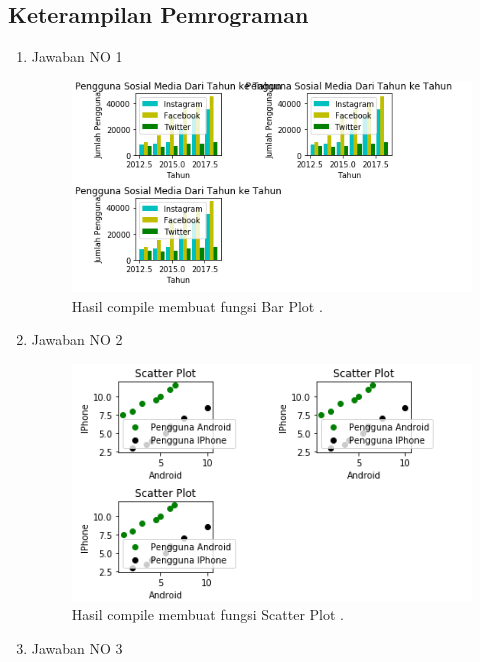 \subsection{Keterampilan Pemrograman}
\begin{enumerate}
\item Jawaban NO 1


\begin{figure}[H]
	\includegraphics[width=12cm]{figures/6/1174069/Praktek/bar.png}
	\centering
	\caption{Hasil compile membuat fungsi Bar Plot .}
\end{figure}

\item Jawaban NO 2


\begin{figure}[H]
	\includegraphics[width=12cm]{figures/6/1174069/Praktek/scatter.png}
	\centering
	\caption{Hasil compile membuat fungsi Scatter Plot .}
\end{figure}

\item Jawaban NO 3



\end{enumerate}
